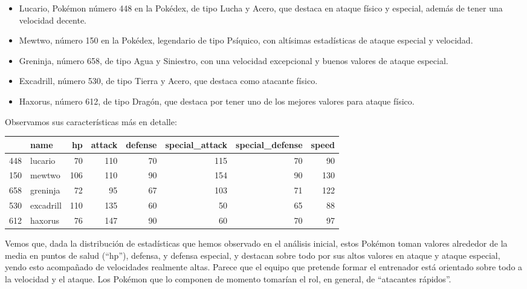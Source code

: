 \documentclass[
  11.8pt,
]{extreport}
\begin{document}
\begin{itemize}
\item
  Lucario, Pokémon número 448 en la Pokédex, de tipo Lucha y Acero, que
  destaca en ataque físico y especial, además de tener una velocidad
  decente.
\item
  Mewtwo, número 150 en la Pokédex, legendario de tipo Psíquico, con
  altísimas estadísticas de ataque especial y velocidad.
\item
  Greninja, número 658, de tipo Agua y Siniestro, con una velocidad
  excepcional y buenos valores de ataque especial.
\item
  Excadrill, número 530, de tipo Tierra y Acero, que destaca como
  atacante físico.
\item
  Haxorus, número 612, de tipo Dragón, que destaca por tener uno de los
  mejores valores para ataque físico.
\end{itemize}

Observamos sus características más en detalle:

\begin{table}[H]
\centering\begingroup\fontsize{10.5}{12.5}\selectfont

\begin{tabular}{llrrrrrr}
\toprule
  & name & hp & attack & defense & special\_attack & special\_defense & speed\\
\midrule
448 & lucario & 70 & 110 & 70 & 115 & 70 & 90\\
150 & mewtwo & 106 & 110 & 90 & 154 & 90 & 130\\
658 & greninja & 72 & 95 & 67 & 103 & 71 & 122\\
530 & excadrill & 110 & 135 & 60 & 50 & 65 & 88\\
612 & haxorus & 76 & 147 & 90 & 60 & 70 & 97\\
\bottomrule
\end{tabular}
\endgroup{}
\end{table}

Vemos que, dada la distribución de estadísticas que hemos observado en
el análisis inicial, estos Pokémon toman valores alrededor de la media
en puntos de salud (``hp''), defensa, y defensa especial, y destacan
sobre todo por sus altos valores en ataque y ataque especial, yendo esto
acompañado de velocidades realmente altas. Parece que el equipo que
pretende formar el entrenador está orientado sobre todo a la velocidad y
el ataque. Los Pokémon que lo componen de momento tomarían el rol, en
general, de ``atacantes rápidos''.
\end{document}
